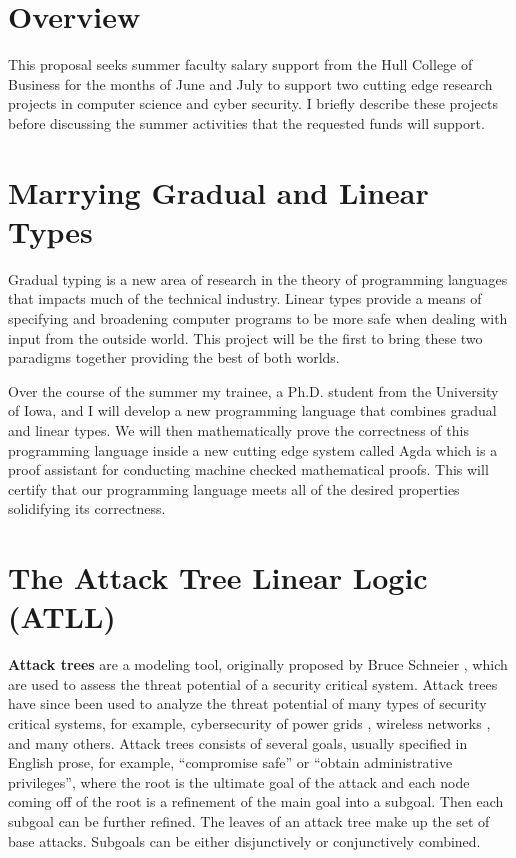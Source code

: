 \begin{full}
\section{Overview}
\label{sec:overview}

This proposal seeks summer faculty salary support from the Hull
College of Business for the months of June and July to support two
cutting edge research projects in computer science and cyber security.
I briefly describe these projects before discussing the summer
activities that the requested funds will support.

\section{Marrying Gradual and Linear Types}
\label{sec:marrying_gradual_and_linear_types}
Gradual typing is a new area of research in the theory of programming
languages that impacts much of the technical industry.  Linear types
provide a means of specifying and broadening computer programs to be
more safe when dealing with input from the outside world.  This
project will be the first to bring these two paradigms together
providing the best of both worlds.

Over the course of the summer my trainee, a Ph.D. student from the
University of Iowa, and I will develop a new programming language that
combines gradual and linear types.  We will then mathematically prove
the correctness of this programming language inside a new cutting edge
system called Agda which is a proof assistant for conducting machine
checked mathematical proofs.  This will certify that our programming
language meets all of the desired properties solidifying its
correctness.

\section{The Attack Tree Linear Logic (ATLL)}
\label{sec:the_attack_tree_linear_logic_(atll)}
\textbf{Attack trees} are a modeling tool, originally proposed by
Bruce Schneier \cite{Schneier:1999}, which are used to assess the
threat potential of a security critical system.  Attack trees have
since been used to analyze the threat potential of many types of
security critical systems, for example, cybersecurity of power grids
\cite{Ten:2007}, wireless networks \cite{Reinhardt:2012}, and many
others.  Attack trees consists of several goals, usually specified in
English prose, for example, ``compromise safe'' or ``obtain
administrative privileges'', where the root is the ultimate goal of
the attack and each node coming off of the root is a refinement of the
main goal into a subgoal.  Then each subgoal can be further refined.
The leaves of an attack tree make up the set of base attacks.  Subgoals
can be either disjunctively or conjunctively combined.


\end{full}
